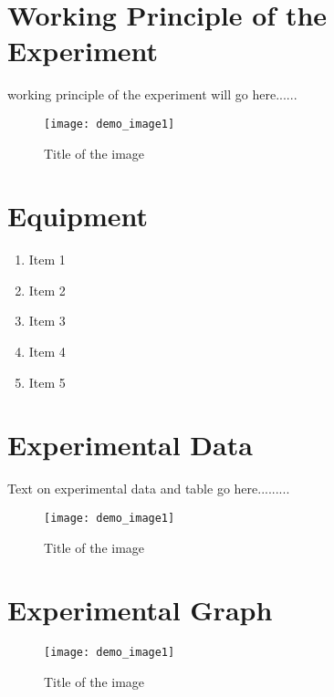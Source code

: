 \section*{Working Principle of the Experiment}
working principle of the experiment will go here......
\begin{figure}[h]
\begin{center}
 \texttt{[image: demo\_image1]} %
  \caption{Title of the image}\label{Fig:Figure1}
\end{center}
\end{figure}




\section*{Equipment }
\begin{enumerate}
    \item Item 1
    \item Item 2
    \item Item 3
    \item Item 4
    \item Item 5
\end{enumerate}

\section*{Experimental Data  }
Text on experimental data and table go here.........
\begin{figure}[h]
\begin{center}
 \texttt{[image: demo\_image1]} %
 \caption{Title of the image}\label{Fig:Figure2}
\end{center}
\end{figure}


\section*{Experimental Graph}

\begin{figure}[h]
\begin{center}
 \texttt{[image: demo\_image1]} %
 \caption{Title of the image}\label{Fig:Figure3}
\end{center}
\end{figure}
\newpage
